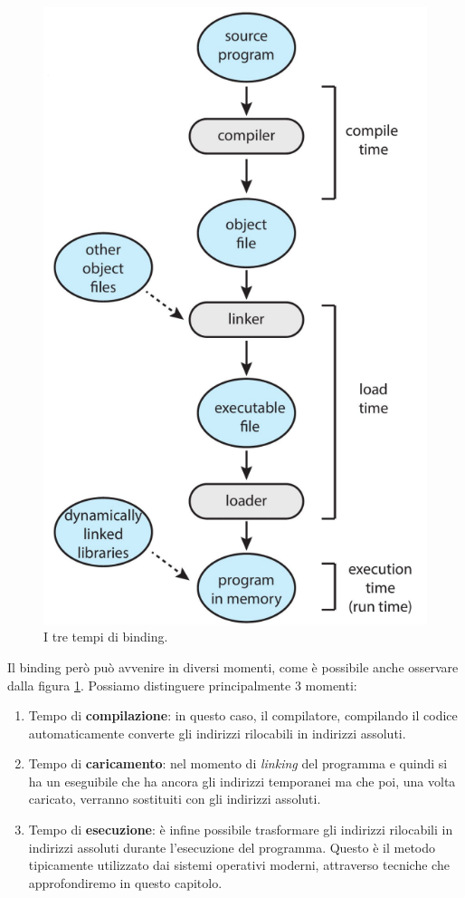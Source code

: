 \begin{figure}
  \includegraphics[width = \linewidth]{../res/imgs/main memory/binding_time.png}
  \caption{I tre tempi di binding.}
  \label{fig:binding_time}
\end{figure}
Il binding però può avvenire in diversi momenti, come è possibile anche osservare dalla figura \ref{fig:binding_time}. Possiamo distinguere principalmente 3 momenti:
\vspace{-5px}
\begin{enumerate}
\setlength{\itemsep}{-.15 em}
    \item Tempo di \textbf{compilazione}: in questo caso, il compilatore, compilando il codice automaticamente converte gli indirizzi rilocabili in indirizzi assoluti.
    \item Tempo di \textbf{caricamento}: nel momento di \textit{linking} del programma e quindi si ha un eseguibile che ha ancora gli indirizzi temporanei ma che poi, una volta caricato, verranno sostituiti con gli indirizzi assoluti.
    \item Tempo di \textbf{esecuzione}: è infine possibile trasformare gli indirizzi rilocabili in indirizzi assoluti durante l'esecuzione del programma. Questo è il metodo tipicamente utilizzato dai sistemi operativi moderni, attraverso tecniche che approfondiremo in questo capitolo.
\end{enumerate}

